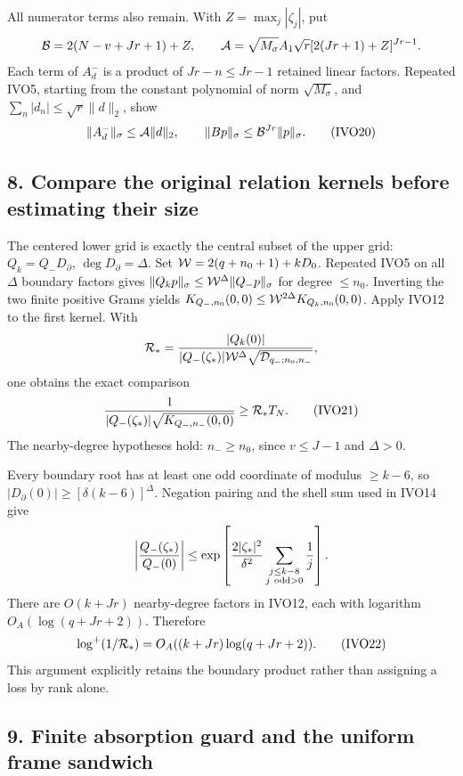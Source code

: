 All numerator terms also remain. With \(Z=\max_j|\zeta_j|\), put \[
{\cal B}=2(N-v+Jr+1)+Z,\qquad
{\cal A}=\sqrt{M_\sigma}A_1\sqrt r[2(Jr+1)+Z]^{Jr-1}.
\] Each term of \(A_d^-\) is a product of \(Jr-n\le Jr-1\) retained linear factors. Repeated IVO5, starting from the constant polynomial of norm \(\sqrt{M_\sigma}\), and \(\sum_n|d_n|\le\sqrt r\|d\|_2\), show \[
\|A_d^-\|_\sigma\le{\cal A}\|d\|_2,\qquad
\|Bp\|_\sigma\le{\cal B}^{Jr}\|p\|_\sigma.
\tag{IVO20}
\]

\subsection{8. Compare the original relation kernels before estimating their size}\label{compare-the-original-relation-kernels-before-estimating-their-size}

The centered lower grid is exactly the central subset of the upper grid: \(Q_k=Q_-D_\partial\), \(\deg D_\partial=\Delta\). Set \({\cal W}=2(q+n_0+1)+kD_0\). Repeated IVO5 on all \(\Delta\) boundary factors gives \(\|Q_kp\|_\sigma\le{\cal W}^{\Delta}\|Q_-p\|_\sigma\) for degree \(\le n_0\). Inverting the two finite positive Grams yields \(K_{Q_-,n_0}(0,0)\le{\cal W}^{2\Delta}K_{Q_k,n_0}(0,0)\). Apply IVO12 to the first kernel. With \[
{\cal R}_*=
\frac{|Q_k(0)|}
{|Q_-(\zeta_*)|{\cal W}^{\Delta}
\sqrt{{\cal D}_{q_-;n_0,n_-}}},
\] one obtains the exact comparison \[
\frac1{|Q_-(\zeta_*)|\sqrt{K_{Q_-,n_-}(0,0)}}
\ge{\cal R}_*T_N.
\tag{IVO21}
\] The nearby-degree hypotheses hold: \(n_-\ge n_0\), since \(v\le J-1\) and \(\Delta>0\).

Every boundary root has at least one odd coordinate of modulus \(\ge k-6\), so \(|D_\partial(0)|\ge[\delta(k-6)]^\Delta\). Negation pairing and the shell sum used in IVO14 give \[
\left|\frac{Q_-(\zeta_*)}{Q_-(0)}\right|
\le\exp\left[\frac{2|\zeta_*|^2}{\delta^2}
\sum_{\substack{j\le k-8\\j\ {\rm odd}>0}}\frac1j\right].
\] There are \(O(k+Jr)\) nearby-degree factors in IVO12, each with logarithm \(O_A(\log(q+Jr+2))\). Therefore \[
\log^+(1/{\cal R}_*)=O_A((k+Jr)\log(q+Jr+2)).
\tag{IVO22}
\] This argument explicitly retains the boundary product rather than assigning a loss by rank alone.

\subsection{9. Finite absorption guard and the uniform frame sandwich}\label{finite-absorption-guard-and-the-uniform-frame-sandwich}

